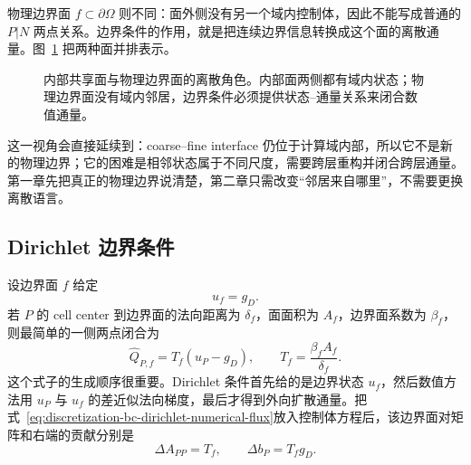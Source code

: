 物理边界面 $f\subset\partial\Omega$ 则不同：面外侧没有另一个域内控制体，因此不能写成普通的 $P|N$ 两点关系。边界条件的作用，就是把连续边界信息转换成这个面的离散通量。图~\ref{fig:discretization-boundary-flux-closure} 把两种面并排表示。

\begin{figure}[htbp]
\centering
{}
\caption{内部共享面与物理边界面的离散角色。内部面两侧都有域内状态；物理边界面没有域内邻居，边界条件必须提供状态--通量关系来闭合数值通量。}
\label{fig:discretization-boundary-flux-closure}
\end{figure}

这一视角会直接延续到：coarse--fine interface 仍位于计算域内部，所以它不是新的物理边界；它的困难是相邻状态属于不同尺度，需要跨层重构并闭合跨层通量。第一章先把真正的物理边界说清楚，第二章只需改变“邻居来自哪里”，不需要更换离散语言。

\subsection{Dirichlet 边界条件}

设边界面 $f$ 给定
\begin{equation}
u_f=g_D.
\end{equation}
若 $P$ 的 cell center 到边界面的法向距离为 $\delta_f$，面面积为 $A_f$，边界面系数为 $\beta_f$，则最简单的一侧两点闭合为
\begin{equation}
\boxed{
\widehat Q_{P,f}
=T_f(u_P-g_D),
\qquad
T_f=\frac{\beta_fA_f}{\delta_f}.
}
\label{eq:discretization-bc-dirichlet-numerical-flux}
\end{equation}
这个式子的生成顺序很重要。Dirichlet 条件首先给的是边界状态 $u_f$，然后数值方法用 $u_P$ 与 $u_f$ 的差近似法向梯度，最后才得到外向扩散通量。把式~\eqref{eq:discretization-bc-dirichlet-numerical-flux}放入控制体方程后，该边界面对矩阵和右端的贡献分别是
\begin{equation}
\Delta A_{PP}=T_f,
\qquad
\Delta b_P=T_fg_D.
\end{equation}

